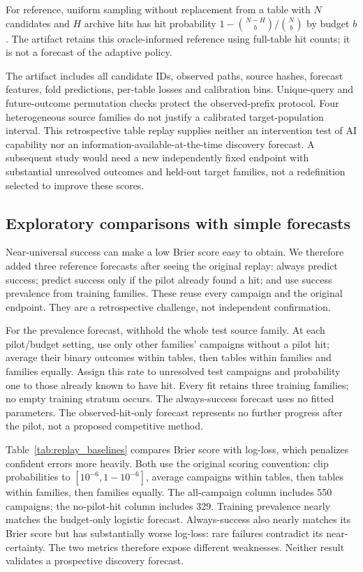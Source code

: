 For reference, uniform sampling without replacement from a table with $N$ candidates and $H$ archive hits has hit probability $1-\binom{N-H}{b}/\binom{N}{b}$ by budget $b$. The artifact retains this oracle-informed reference using full-table hit counts; it is not a forecast of the adaptive policy.

The artifact includes all candidate IDs, observed paths, source hashes, forecast features, fold predictions, per-table losses and calibration bins. Unique-query and future-outcome permutation checks protect the observed-prefix protocol. Four heterogeneous source families do not justify a calibrated target-population interval. This retrospective table replay supplies neither an intervention test of AI capability nor an information-available-at-the-time discovery forecast. A subsequent study would need a new independently fixed endpoint with substantial unresolved outcomes and held-out target families, not a redefinition selected to improve these scores.

\subsection{Exploratory comparisons with simple forecasts}
\label{app:replay_baselines}
Near-universal success can make a low Brier score easy to obtain. We therefore added three reference forecasts after seeing the original replay: always predict success; predict success only if the pilot already found a hit; and use success prevalence from training families. These reuse every campaign and the original endpoint. They are a retrospective challenge, not independent confirmation.

For the prevalence forecast, withhold the whole test source family. At each pilot/budget setting, use only other families' campaigns without a pilot hit; average their binary outcomes within tables, then tables within families and families equally. Assign this rate to unresolved test campaigns and probability one to those already known to have hit. Every fit retains three training families; no empty training stratum occurs. The always-success forecast uses no fitted parameters. The observed-hit-only forecast represents no further progress after the pilot, not a proposed competitive method.

Table~\ref{tab:replay_baselines} compares Brier score with log-loss, which penalizes confident errors more heavily. Both use the original scoring convention: clip probabilities to $[10^{-6},1-10^{-6}]$, average campaigns within tables, then tables within families, then families equally. The all-campaign column includes 550 campaigns; the no-pilot-hit column includes 329. Training prevalence nearly matches the budget-only logistic forecast. Always-success also nearly matches its Brier score but has substantially worse log-loss: rare failures contradict its near-certainty. The two metrics therefore expose different weaknesses. Neither result validates a prospective discovery forecast.

